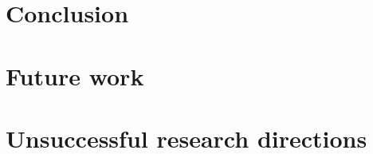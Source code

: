 
\section{Conclusion}
\lipsum[11]
\section{Future work}
\lipsum[13]
\section{Unsuccessful research directions}
\lipsum[13]
